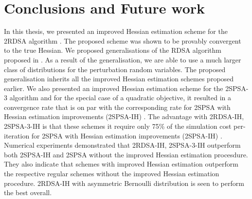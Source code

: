 \chapter{Conclusions and Future work}\label{conc}
\label{sec:conclusions}
In this thesis, we presented an improved Hessian estimation scheme for the 2RDSA algorithm \cite{prashanth2015rdsa}. The proposed scheme was shown to be provably convergent to the true Hessian. We proposed generalisations of the RDSA algorithm proposed in \cite{prashanth2015rdsa}. As a result of the generalisation, we are able to use a much larger class of distributions  for the perturbation random variables. The proposed generalisation inherits all the improved Hessian estimation  schemes proposed earlier. We also presented an improved Hessian estimation scheme for the 2SPSA-3 algorithm \cite{bhatnagar2015simultaneous} and for the special case of a quadratic objective, it resulted in a  convergence rate that is on par with the corresponding rate for 2SPSA with Hessian estimation improvements (2SPSA-IH) \cite{spall-jacobian}. The advantage with 2RDSA-IH, 2SPSA-3-IH is that these schemes it require only 75\% of the simulation cost per-iteration for 2SPSA with Hessian estimation improvements (2SPSA-IH) \cite{spall-jacobian}. Numerical experiments demonstrated that 2RDSA-IH, 2SPSA-3-IH outperform both 2SPSA-IH and 2SPSA without the improved Hessian estimation procesdure. They also indicate that schemes with improved Hessian estimation outperform the respective regular schemes without the improved Hessian estimation procedure. 2RDSA-IH with asymmetric Bernoulli distribution is seen to perform the best overall.

